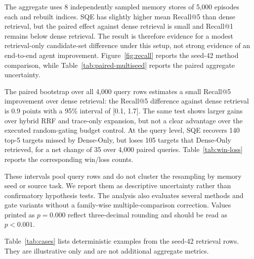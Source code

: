 \documentclass[10pt,twocolumn]{article}
\begin{document}
The aggregate uses 8 independently sampled memory stores of 5,000 episodes each and rebuilt
indices. SQE has slightly higher mean Recall@5 than dense retrieval, but the
paired effect against dense retrieval is small and Recall@1 remains below dense
retrieval. The result is therefore evidence for a modest retrieval-only
candidate-set difference under this setup, not strong evidence of an end-to-end
agent improvement. Figure~\ref{fig:recall} reports the
seed-42 method comparison, while Table~\ref{tab:paired-multiseed} reports the
paired aggregate uncertainty.

\begin{table}[!tbp]
\caption{Paired bootstrap tests over all independent memory-index seeds.}
\label{tab:paired-multiseed}
\centering
\scriptsize

\end{table}

The paired bootstrap over all 4,000 query rows estimates a
small Recall@5 improvement over dense retrieval: the Recall@5 difference against dense retrieval is 0.9 points with a 95\% interval of [0.1, 1.7]. The
same test shows larger gains over hybrid RRF and trace-only expansion, but not
a clear advantage over the executed random-gating budget control.
At the query level, SQE recovers 140 top-5 targets missed by Dense-Only, but loses 105 targets that Dense-Only retrieved, for a net change of 35 over 4,000 paired queries. Table~\ref{tab:win-loss} reports the corresponding
win/loss counts.

These intervals pool query rows and do not cluster the resampling by memory seed
or source task. We report them as descriptive uncertainty rather than confirmatory
hypothesis tests. The analysis also evaluates several methods and gate variants
without a family-wise multiple-comparison correction. Values printed as
$p=0.000$ reflect three-decimal rounding and should be read as $p<0.001$.

\begin{table}[!tbp]
\caption{Query-level top-5 wins and losses for SQE against Dense-Only.}
\label{tab:win-loss}
\centering
\scriptsize

\end{table}

Table~\ref{tab:cases} lists deterministic examples from the seed-42 retrieval
rows. They are illustrative only and are not additional aggregate metrics.

\begin{table}[!tbp]
\caption{Seed-42 examples where SQE and Dense-Only differ at top-5.}
\label{tab:cases}
\centering
\scriptsize
\resizebox{\linewidth}{!}{}
\end{table}
\end{document}
